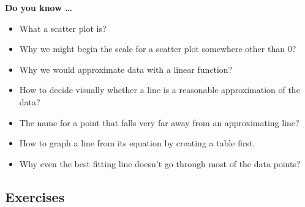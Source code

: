 


\noindent \textbf{Do you know \ldots}

\begin{itemize} 
\item What a scatter plot is? 
\item Why we might begin the scale for a scatter plot somewhere other than 0?
\item Why we would approximate data with a linear function? 
\item How to decide visually whether a line is a reasonable approximation of the data? 
\item The name for a point that falls very far away from an approximating line? 
\item How to graph a line from its equation by creating a table first.
\item Why even the best fitting line doesn't go through most of the data points?
    
\end{itemize}

\subsection*{Exercises}

